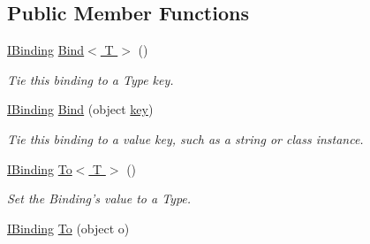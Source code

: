 \subsection*{Public Member Functions}
\begin{DoxyCompactItemize}
\item 
\hypertarget{interfacestrange_1_1framework_1_1api_1_1_i_binding_a905b1b245556d8577f2ef99f036a0b74}{\hyperlink{interfacestrange_1_1framework_1_1api_1_1_i_binding}{I\-Binding} \hyperlink{interfacestrange_1_1framework_1_1api_1_1_i_binding_a905b1b245556d8577f2ef99f036a0b74}{Bind$<$ T $>$} ()}\label{interfacestrange_1_1framework_1_1api_1_1_i_binding_a905b1b245556d8577f2ef99f036a0b74}

\begin{DoxyCompactList}\small\item\em Tie this binding to a Type key. \end{DoxyCompactList}\item 
\hypertarget{interfacestrange_1_1framework_1_1api_1_1_i_binding_a3db9dab7cff1c641ee8d416e5027d2e2}{\hyperlink{interfacestrange_1_1framework_1_1api_1_1_i_binding}{I\-Binding} \hyperlink{interfacestrange_1_1framework_1_1api_1_1_i_binding_a3db9dab7cff1c641ee8d416e5027d2e2}{Bind} (object \hyperlink{interfacestrange_1_1framework_1_1api_1_1_i_binding_acec8686208598f9f4a952ffd05449c4d}{key})}\label{interfacestrange_1_1framework_1_1api_1_1_i_binding_a3db9dab7cff1c641ee8d416e5027d2e2}

\begin{DoxyCompactList}\small\item\em Tie this binding to a value key, such as a string or class instance. \end{DoxyCompactList}\item 
\hypertarget{interfacestrange_1_1framework_1_1api_1_1_i_binding_a11058132bdc6b6eb7a9a258caa5e5abb}{\hyperlink{interfacestrange_1_1framework_1_1api_1_1_i_binding}{I\-Binding} \hyperlink{interfacestrange_1_1framework_1_1api_1_1_i_binding_a11058132bdc6b6eb7a9a258caa5e5abb}{To$<$ T $>$} ()}\label{interfacestrange_1_1framework_1_1api_1_1_i_binding_a11058132bdc6b6eb7a9a258caa5e5abb}

\begin{DoxyCompactList}\small\item\em Set the Binding's value to a Type. \end{DoxyCompactList}\item 
\hypertarget{interfacestrange_1_1framework_1_1api_1_1_i_binding_a4f7d063a91e5e6dcadc0c4854b010517}{\hyperlink{interfacestrange_1_1framework_1_1api_1_1_i_binding}{I\-Binding} \hyperlink{interfacestrange_1_1framework_1_1api_1_1_i_binding_a4f7d063a91e5e6dcadc0c4854b010517}{To} (object o)}\label{interfacestrange_1_1framework_1_1api_1_1_i_binding_a4f7d063a91e5e6dcadc0c4854b010517}


\end{DoxyCompactItemize}

